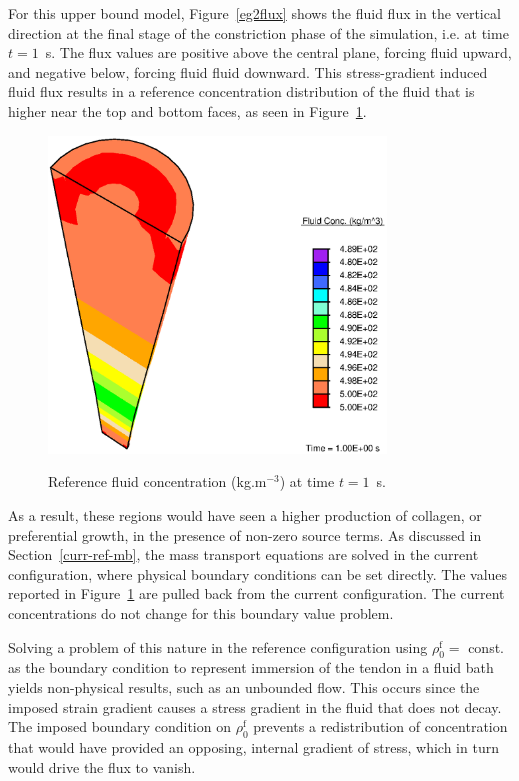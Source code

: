 \noindent For this upper bound model, Figure~\ref{eg2flux} shows the fluid flux in
the vertical direction at the final stage of the constriction phase of
the simulation, i.e. at time $t=1$~s. The flux values are positive
above the central plane, forcing fluid upward, and negative below,
forcing fluid fluid downward. This stress-gradient induced fluid flux
results in a reference concentration distribution of the fluid that is
higher near the top and bottom faces, as seen in Figure~\ref{eg2conc}.

\begin{figure}[!hpt]
  \centering
      {\includegraphics[width=0.8\textwidth]{images/examples/lagrangian/constriction/fluid-concentration}}
      \caption{Reference fluid concentration (kg.m$^{-3}$) at time
      $t=1$~s.}
      \label{eg2conc}
\end{figure}

As a result, these regions would have seen a higher production of
collagen, or preferential growth, in the presence of non-zero source
terms. As discussed in Section~\ref{curr-ref-mb}, the mass transport
equations are solved in the current configuration, where physical
boundary conditions can be set directly. The values reported in
Figure~\ref{eg2conc} are pulled back from the current
configuration. The current concentrations do not change for this
boundary value problem. 

Solving a problem of this nature in the
reference configuration using $\rho_0^\mathrm{f} = $ const. as the
boundary condition to represent immersion of the tendon in a fluid bath
yields non-physical results, such as an unbounded flow. This occurs
since the imposed strain gradient causes a stress gradient in the
fluid that does not decay. The imposed boundary condition on $\rho_0^\mathrm{f}$
prevents a redistribution of concentration that would have provided an
opposing, internal gradient of stress, which in turn would drive the
flux to vanish.


